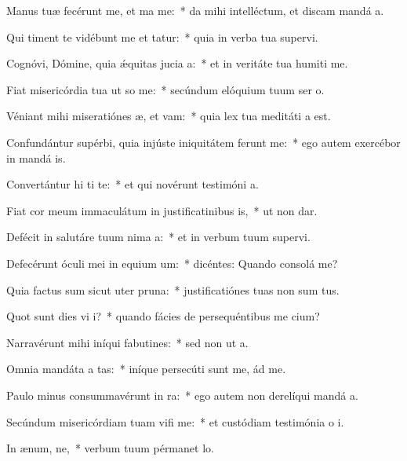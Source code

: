 \item Manus tuæ fecérunt me, et ma me:~* da mihi intelléctum, et discam mandá a.
\item Qui timent te vidébunt me et tatur:~* quia in verba tua supervi.
\item Cognóvi, Dómine, quia ǽquitas jucia a:~* et in veritáte tua humiti me.
\item Fiat misericórdia tua ut so me:~* secúndum elóquium tuum ser o.
\item Véniant mihi miseratiónes æ, et vam:~* quia lex tua meditáti a est.
\item Confundántur supérbi, quia injúste iniquitátem ferunt  me:~* ego autem exercébor in mandá is.
\item Convertántur hi ti te:~* et qui novérunt testimóni a.
\item Fiat cor meum immaculátum in justificatinibus is,~* ut non dar.
\item Defécit in salutáre tuum nima a:~* et in verbum tuum supervi.
\item Defecérunt óculi mei in equium um:~* dicéntes: Quando consolá me?
\item Quia factus sum sicut uter  pruna:~* justificatiónes tuas non sum tus.
\item Quot sunt dies vi i?~* quando fácies de persequéntibus me cium?
\item Narravérunt mihi iníqui fabutines:~* sed non ut  a.
\item Omnia mandáta a tas:~* iníque persecúti sunt me, ád me.
\item Paulo minus consummavérunt  in ra:~* ego autem non derelíqui mandá a.
\item Secúndum misericórdiam tuam vifi me:~* et custódiam testimónia o i.
\item In ænum, ne,~* verbum tuum pérmanet  lo.
